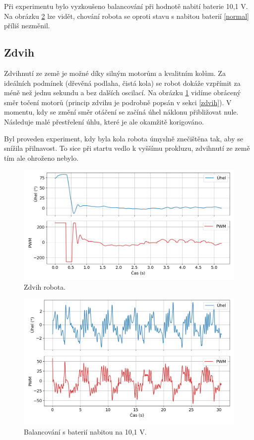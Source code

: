 Při experimentu bylo vyzkoušeno balancování při hodnotě nabití baterie 10,1 V. Na obrázku \ref{low} lze vidět, chování robota se oproti stavu s nabitou baterií \ref{normal} příliš nezměnil.

\subsection*{Zdvih}
Zdvihnutí ze země je možné díky silným motorům a kvalitním kolům. Za ideálních podmínek (dřevěná podlaha, čistá kola) se robot dokáže vzpřímit za méně než jednu sekundu a bez dalších oscilací. Na obrázku \ref{stand-up} vidíme obrácený směr točení motorů (princip zdvihu je podrobně popsán v sekci \ref{zdvih}). V momentu, kdy se změní směr otáčení se začíná úhel náklonu přibližovat nule. Následuje malé přestřelení úhlu, které je ale okamžitě korigováno.

Byl proveden experiment, kdy byla kola robota úmyslně znečištěna tak, aby se snížila přilnavost. To sice při startu vedlo k vyššímu prokluzu, zdvihnutí ze země tím ale ohroženo nebylo.

\begin{figure}[H]
  \centering
  \includegraphics[width=1.\linewidth]{obrazky-figures/stand_up.png}%
  \caption{Zdvih robota.}
  \label{stand-up}
\end{figure}

\begin{figure}[H]
  \centering
  \includegraphics[width=1.0\linewidth]{obrazky-figures/low.png}%
  \caption{Balancování s baterií nabitou na 10,1 V.}
  \label{low}
\end{figure}

